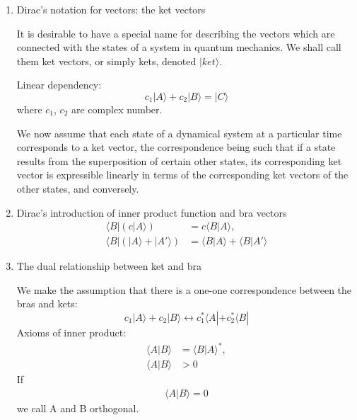 \documentclass[12pt]{article}
\numberwithin{equation}{section}
\begin{document}
\begin{enumerate}
\item Dirac's notation for vectors: the {\color{red}ket vectors} \par
	It is desirable to have a special name for describing the vectors which are connected with the states of a system in quantum mechanics. We shall call them ket vectors, or simply kets, denoted $|ket \rangle$. \par
	Linear dependency:
	\begin{equation}
		c_1|A\rangle+c_2|B\rangle=|C\rangle
	\end{equation}
	where $c_1$, $c_2$ are complex number. \par
	We now assume that each state of a dynamical system at a particular time corresponds to a ket vector, the correspondence being such that if a state results from the superposition of certain other states, its corresponding ket vector is expressible linearly in terms of the corresponding ket vectors of the other states, and conversely.
\item Dirac's introduction of inner product function and {\color{red}bra vectors} 
	\begin{equation}\begin{split}
		\langle B|(c|A\rangle) &= c\langle B|A\rangle, \\
		\langle B|(|A\rangle+|A'\rangle) &= \langle B|A\rangle + \langle B|A'\rangle
	\end{split}\end{equation}
\item The dual relationship between ket and bra \par
	We make the assumption that there is a one-one correspondence between the bras and kets:
	\begin{equation}
		c_1|A\rangle + c_2|B\rangle \leftrightarrow c_1^*\langle A| + c_2^*\langle B|
	\end{equation}
	Axioms of inner product:
	\begin{equation}\begin{split}
		\langle A|B \rangle &= \langle B|A \rangle^*, \\
		\langle A|B \rangle &> 0
	\end{split}\end{equation}
	If 
	\begin{equation}\begin{split}
		\langle A|B \rangle = 0
	\end{split}\end{equation}
	we call A and B orthogonal.
\end{enumerate}
\end{document}
